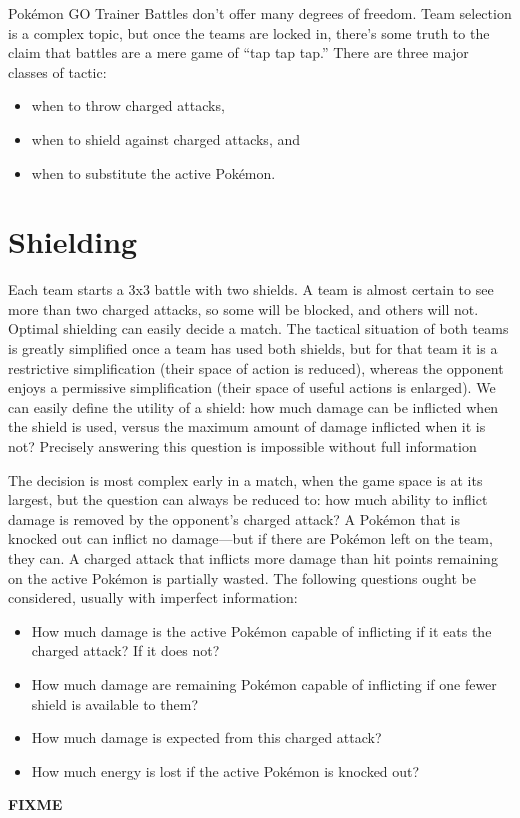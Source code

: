 Pokémon GO Trainer Battles don't offer many degrees of freedom.
Team selection is a complex topic, but once the teams are locked in, there's
 some truth to the claim that battles are a mere game of ``tap tap tap.''
There are three major classes of tactic:
\begin{itemize}
\item when to throw charged attacks,
\item when to shield against charged attacks, and
\item when to substitute the active Pokémon.
\end{itemize}

\section{Shielding}
Each team starts a 3x3 battle with two shields.
A team is almost certain to see more than two charged attacks, so some will be
 blocked, and others will not.
Optimal shielding can easily decide a match.
The tactical situation of both teams is greatly simplified once a team has
 used both shields, but for that team it is a restrictive simplification (their space of action is reduced),
 whereas the opponent enjoys a permissive simplification (their space of useful actions is enlarged).
We can easily define the utility of a shield: how much damage can be inflicted when the shield is used,
 versus the maximum amount of damage inflicted when it is not?
Precisely answering this question is impossible without full information

The decision is most complex early in a match, when the game space is at its largest,
 but the question can always be reduced to: how much ability to inflict damage
 is removed by the opponent's charged attack?
A Pokémon that is knocked out can inflict no damage---but if there are Pokémon
 left on the team, they can.
A charged attack that inflicts more damage than hit points remaining on the
 active Pokémon is partially wasted.
The following questions ought be considered, usually with imperfect information:
\begin{itemize}
\item How much damage is the active Pokémon capable of inflicting if it eats the
   charged attack? If it does not?
\item How much damage are remaining Pokémon capable of inflicting if one fewer
  shield is available to them?
\item How much damage is expected from this charged attack?
\item How much energy is lost if the active Pokémon is knocked out?
\end{itemize}
\textbf{FIXME}

